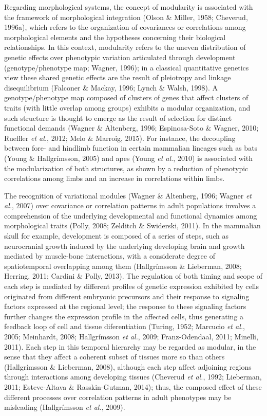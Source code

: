 \documentclass[12pt,twoside]{report}
\begin{document}
Regarding morphological systems, the concept of modularity is associated
with the framework of morphological integration (Olson \& Miller, 1958;
Cheverud, 1996a), which refers to the organization of covariances or
correlations among morphological elements and the hypotheses concerning
their biological relationships. In this context, modularity refers to
the uneven distribution of genetic effects over phenotypic variation
articulated through development (genotype/phenotype map; Wagner, 1996);
in a classical quantitative genetics view these shared genetic effects
are the result of pleiotropy and linkage disequilibrium (Falconer \&
Mackay, 1996; Lynch \& Walsh, 1998). A genotype/phenotype map composed
of clusters of genes that affect clusters of traits (with little overlap
among groups) exhibits a modular organization, and such structure is
thought to emerge as the result of selection for distinct functional
demands (Wagner \& Altenberg, 1996; Espinosa-Soto \& Wagner, 2010;
Rueffler \emph{et al.}, 2012; Melo \& Marroig, 2015). For instance, the
decoupling between fore- and hindlimb function in certain mammalian
lineages such as bats (Young \& Hallgrímsson, 2005) and apes (Young
\emph{et al.}, 2010) is associated with the modularization of both
structures, as shown by a reduction of phenotypic correlations among
limbs and an increase in correlations within limbs.

The recognition of variational modules (Wagner \& Altenberg, 1996;
Wagner \emph{et al.}, 2007) over covariance or correlation patterns in
adult populations involves a comprehension of the underlying
developmental and functional dynamics among morphological traits (Polly,
2008; Zelditch \& Swiderski, 2011). In the mammalian skull for example,
development is composed of a series of steps, such as neurocranial
growth induced by the underlying developing brain and growth mediated by
muscle-bone interactions, with a considerate degree of spatiotemporal
overlapping among them (Hallgrímsson \& Lieberman, 2008; Herring, 2011;
Cardini \& Polly, 2013). The regulation of both timing and scope of each
step is mediated by different profiles of genetic expression exhibited
by cells originated from different embryonic precursors and their
response to signaling factors expressed at the regional level; the
response to these signaling factors further changes the expression
profile in the affected cells, thus generating a feedback loop of cell
and tissue diferentiation (Turing, 1952; Marcucio \emph{et al.}, 2005;
Meinhardt, 2008; Hallgrímsson \emph{et al.}, 2009; Franz-Odendaal, 2011;
Minelli, 2011). Each step in this temporal hierarchy may be regarded as
modular, in the sense that they affect a coherent subset of tissues more
so than others (Hallgrímsson \& Lieberman, 2008), although each step
affect adjoining regions through interactions among developing tissues
(Cheverud \emph{et al.}, 1992; Lieberman, 2011; Esteve-Altava \&
Rasskin-Gutman, 2014); thus, the composed effect of these different
processes over correlation patterns in adult phenotypes may be
misleading (Hallgrímsson \emph{et al.}, 2009).
\end{document}
